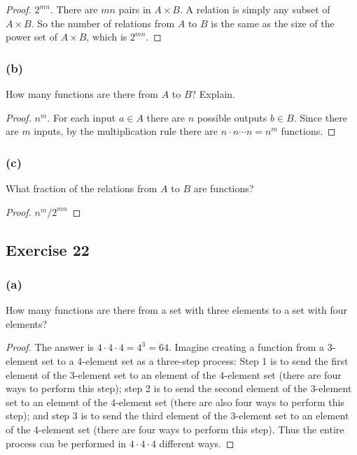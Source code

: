 \documentclass[14pt]{extarticle}
\begin{document}
\begin{proof}
     \(2^{mn}\). There are $mn$ pairs in \(A \times B\). A relation is simply any subset of \(A \times B\). So the
     number of relations from $A$ to $B$ is the same as the size of the power set of \(A \times B\), which is \(2^{mn}\).
\end{proof}

\subsubsection{(b)}
How many functions are there from $A$ to $B$? Explain.

\begin{proof}
     \(n^m\). For each input \(a \in A\) there are $n$ possible outputs \(b \in B\). Since there are $m$ inputs, by the
     multiplication rule there are \(n \cdot n \cdots n = n^m\) functions.
\end{proof}

\subsubsection{(c)}
What fraction of the relations from $A$ to $B$ are functions?

\begin{proof}
     \(n^m / 2^{mn}\)
\end{proof}

\subsection{Exercise 22}
\subsubsection{(a)}
How many functions are there from a set with three elements to a set with four elements?

\begin{proof}
     The answer is \(4 \cdot 4 \cdot 4 = 4^3 = 64\). Imagine creating a function from a 3-element set to a 4-element set
     as a three-step process: Step 1 is to send the first element of the 3-element set to an element of the 4-element
     set (there are four ways to perform this step); step 2 is to send the second element of the 3-element set to an
     element of the 4-element set (there are also four ways to perform this step); and step 3 is to send the third element
     of the 3-element set to an element of the 4-element set (there are four ways to perform this step). Thus the entire
     process can be performed in \(4 \cdot 4 \cdot 4\) different ways.
\end{proof}
\end{document}
